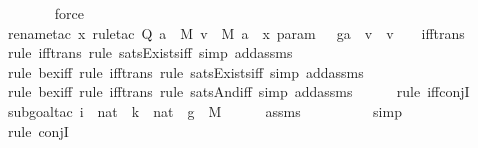 \begin{isabellebody}
\ \ \ \ \ \isamarkupfalse%
\ force\isanewline
\ \ \ \ \isamarkupfalse%
{\isacharparenleft}{\kern0pt}rename{\isacharunderscore}{\kern0pt}tac\ x{\isacharcomma}{\kern0pt}\ rule{\isacharunderscore}{\kern0pt}tac\ Q{\isacharequal}{\kern0pt}\ {\isachardoublequoteopen}{\isasymexists}a\ {\isasymin}\ M{\isachardot}{\kern0pt}\ {\isasymexists}v\ {\isasymin}\ M{\isachardot}{\kern0pt}\ a\ {\isacharequal}{\kern0pt}\ {\isacharless}{\kern0pt}x{\isacharcomma}{\kern0pt}\ param{\isachargreater}{\kern0pt}\ {\isasymand}\ \ g{\isacharbackquote}{\kern0pt}a\ {\isacharequal}{\kern0pt}\ v\ {\isasymand}\ v\ {\isacharequal}{\kern0pt}\ {}{\isachardoublequoteclose}\ \ iff{\isacharunderscore}{\kern0pt}trans{\isacharparenright}{\kern0pt}\isanewline
\ \ \ \ \ \isamarkupfalse%
{\isacharparenleft}{\kern0pt}rule\ iff{\isacharunderscore}{\kern0pt}trans{\isacharcomma}{\kern0pt}\ rule\ sats{\isacharunderscore}{\kern0pt}Exists{\isacharunderscore}{\kern0pt}iff{\isacharcomma}{\kern0pt}\ simp\ add{\isacharcolon}{\kern0pt}assms{\isacharparenright}{\kern0pt}\isanewline
\ \ \ \ \ \isamarkupfalse%
{\isacharparenleft}{\kern0pt}rule\ bex{\isacharunderscore}{\kern0pt}iff{\isacharcomma}{\kern0pt}\ rule\ iff{\isacharunderscore}{\kern0pt}trans{\isacharcomma}{\kern0pt}\ rule\ sats{\isacharunderscore}{\kern0pt}Exists{\isacharunderscore}{\kern0pt}iff{\isacharcomma}{\kern0pt}\ simp\ add{\isacharcolon}{\kern0pt}assms{\isacharparenright}{\kern0pt}\isanewline
\ \ \ \ \ \isamarkupfalse%
{\isacharparenleft}{\kern0pt}rule\ bex{\isacharunderscore}{\kern0pt}iff{\isacharcomma}{\kern0pt}\ rule\ iff{\isacharunderscore}{\kern0pt}trans{\isacharcomma}{\kern0pt}\ rule\ sats{\isacharunderscore}{\kern0pt}And{\isacharunderscore}{\kern0pt}iff{\isacharcomma}{\kern0pt}\ simp\ add{\isacharcolon}{\kern0pt}assms{\isacharparenright}{\kern0pt}\isanewline
\ \ \ \ \ \isamarkupfalse%
{\isacharparenleft}{\kern0pt}rule\ iff{\isacharunderscore}{\kern0pt}conjI{\isacharparenright}{\kern0pt}\isanewline
\ \ \ \ \isamarkupfalse%
{\isacharparenleft}{\kern0pt}subgoal{\isacharunderscore}{\kern0pt}tac\ {\isachardoublequoteopen}i\ {\isasymin}\ nat\ {\isasymand}\ k\ {\isasymin}\ nat\ {\isasymand}\ g\ {\isasymin}\ M{\isachardoublequoteclose}{\isacharparenright}{\kern0pt}\isanewline
\ \ \ \ \isamarkupfalse%
\ assms\ \isanewline
\ \ \ \ \ \ \ \isamarkupfalse%
\ simp\isanewline
\ \ \ \ \ \ \isamarkupfalse%
{\isacharparenleft}{\kern0pt}rule\ conjI{\isacharparenright}{\kern0pt}\isanewline

\end{isabellebody}

